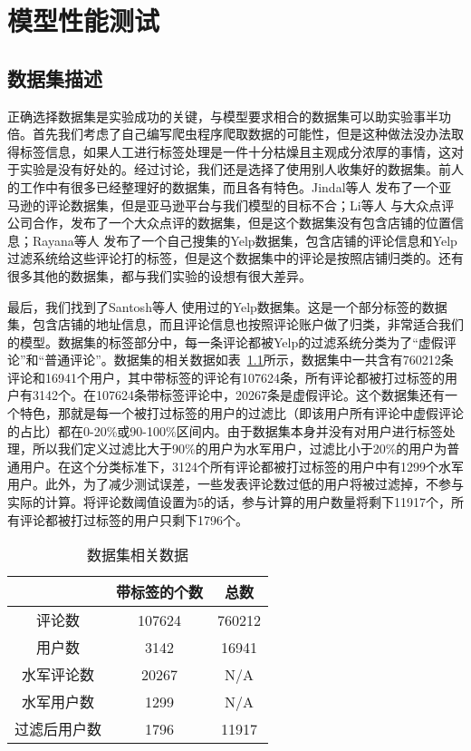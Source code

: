 
\chapter{模型性能测试}
\label{chap:exper}



\section{数据集描述}

正确选择数据集是实验成功的关键，与模型要求相合的数据集可以助实验事半功倍。首先我们考虑了自己编写爬虫程序爬取数据的可能性，但是这种做法没办法取得标签信息，如果人工进行标签处理是一件十分枯燥且主观成分浓厚的事情，这对于实验是没有好处的。经过讨论，我们还是选择了使用别人收集好的数据集。前人的工作中有很多已经整理好的数据集，而且各有特色。Jindal等人 \parencite{Jindal:2008}发布了一个亚马逊的评论数据集，但是亚马逊平台与我们模型的目标不合；Li等人 \parencite{Li:2014}与大众点评公司合作，发布了一个大众点评的数据集，但是这个数据集没有包含店铺的位置信息；Rayana等人 \parencite{Rayana:2015}发布了一个自己搜集的Yelp数据集，包含店铺的评论信息和Yelp过滤系统给这些评论打的标签，但是这个数据集中的评论是按照店铺归类的。还有很多其他的数据集，都与我们实验的设想有很大差异。

最后，我们找到了Santosh等人 \parencite{Santosh:2016}使用过的Yelp数据集。这是一个部分标签的数据集，包含店铺的地址信息，而且评论信息也按照评论账户做了归类，非常适合我们的模型。数据集的标签部分中，每一条评论都被Yelp的过滤系统分类为了“虚假评论”和“普通评论”。数据集的相关数据如表~\ref{tbl:dataset}所示，数据集中一共含有760212条评论和16941个用户，其中带标签的评论有107624条，所有评论都被打过标签的用户有3142个。在107624条带标签评论中，20267条是虚假评论。这个数据集还有一个特色，那就是每一个被打过标签的用户的过滤比（即该用户所有评论中虚假评论的占比）都在0-20\%或90-100\%区间内。由于数据集本身并没有对用户进行标签处理，所以我们定义过滤比大于90\%的用户为水军用户，过滤比小于20\%的用户为普通用户。在这个分类标准下，3124个所有评论都被打过标签的用户中有1299个水军用户。此外，为了减少测试误差，一些发表评论数过低的用户将被过滤掉，不参与实际的计算。将评论数阈值设置为5的话，参与计算的用户数量将剩下11917个，所有评论都被打过标签的用户只剩下1796个。

\begin{table}[htbp]
	\caption[数据集相关数据]{数据集相关数据}
	\label{tbl:dataset}
	\centering
	\begin{tabular}{ccc}
		\toprule
		& 带标签的个数 & 总数  \\
		\midrule
		评论数  & 107624  & 760212  \\
		用户数  & 3142  &	16941 \\
		水军评论数 & 20267 & N/A \\
		水军用户数 & 1299 & N/A \\
		过滤后用户数 & 1796 & 11917 \\
		\bottomrule
	\end{tabular}
\end{table}

